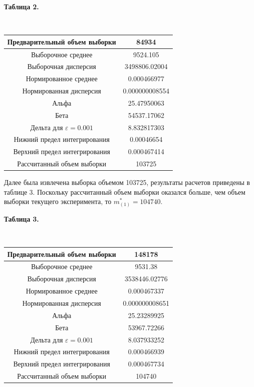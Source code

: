 \documentclass[a4paper, article, 14pt]{extarticle}
\begin{document}
\begin{center}\label{table2}
	\begin{small}
		\textbf{Таблица 2.}
	\end{small}\\
	\hfill \break
	\begin{tabular}{|c|c|}
		\hline
		Предварительный объем выборки & 84934\\
		\hline
		Выборочное среднее & 9524.105\\
		\hline
		Выборочная дисперсия & 3498806.02004\\
		\hline
		Нормированное среднее & 0.000466977\\
		\hline
		Нормированная дисперсия & 0.000000008554\\
		\hline
		Альфа & 25.47950063\\
		\hline
		Бета & 54537.17062\\
		\hline
		Дельта для $\varepsilon = 0.001$ & 8.832817303\\
		\hline
		Нижний предел интегрирования & 0.00046654\\
		\hline
		Верхний предел интегрирования & 0.000467414\\
		\hline
		Рассчитанный объем выборки & 103725\\
		\hline
	\end{tabular}
\end{center}

Далее была извлечена выборка объемом 103725, результаты расчетов приведены в таблице 3. Поскольку рассчитанный объем выборки оказался больше, чем объем выборки текущего эксперимента, то $m_{(1)}^* = 104740$.

\begin{center}\label{table3}
	\begin{small}
		\textbf{Таблица 3.}
	\end{small}\\
	\hfill \break
	\begin{tabular}{|c|c|}
		\hline
		Предварительный объем выборки & 148178\\
		\hline
		Выборочное среднее & 9531.38\\
		\hline
		Выборочная дисперсия & 3538446.02776\\
		\hline
		Нормированное среднее & 0.000467337\\
		\hline
		Нормированная дисперсия & 0.000000008651\\
		\hline
		Альфа & 25.23289925\\
		\hline
		Бета & 53967.72266\\
		\hline
		Дельта для $\varepsilon = 0.001$ & 8.037933252\\
		\hline
		Нижний предел интегрирования & 0.000466939\\
		\hline
		Верхний предел интегрирования & 0.000467734\\
		\hline
		Рассчитанный объем выборки & 104740\\
		\hline
	\end{tabular}
\end{center}
\end{document}

